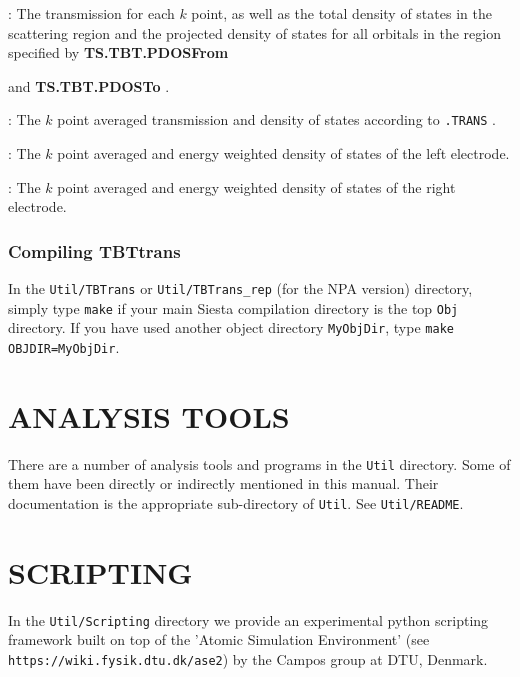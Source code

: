 \documentclass[11pt]{article}
\makeatletter
\newcommand\fdf[1]{%
    \textbf{#1}%
}
\newcommand\file[1]{%
    \texttt{#1}\index{#1@\textbf{#1}}%
}
\newcommand\systemfile[1]{%
    \texttt{<SystemLabel>#1}\index{#1@\textbf{#1}}%
}
\makeatother
\begin{document}
\begin{description}
    \itemsep 10pt
    \parsep 0pt
    
    \item[\systemfile{.TRANS}]: The transmission for each $k$ point,
    as well as the total density of states in the scattering region and the projected
    density of states for all orbitals in the region specified by \fdf{TS.TBT.PDOSFrom}
    and \fdf{TS.TBT.PDOSTo}.

    \item[\systemfile{.AVTRANS}]: The $k$ point averaged
    transmission and density of states according to \file{.TRANS}.

    \item[\systemfile{.LDOS}]: The $k$ point averaged and energy weighted density of states of
    the left electrode.

    \item[\systemfile{.RDOS}]: The $k$ point averaged and energy weighted density of states of
    the right electrode.

\end{description} 

\subsubsection{Compiling TBTtrans}

In the {\tt Util/TBTrans} or \texttt{Util/TBTrans\_rep} (for the NPA version)
 directory, 
simply type {\tt make} if your main {\sc Siesta} compilation 
directory is the top {\tt Obj} directory. If you have used another
 object directory {\tt MyObjDir}, type {\tt make OBJDIR=MyObjDir}.

\section{ANALYSIS TOOLS}

There are a number of analysis tools and programs in the {\tt Util}
directory. Some of them have been directly or indirectly mentioned in
this manual. Their documentation is the appropriate sub-directory of
{\tt Util}. See {\tt Util/README}.

\section{SCRIPTING}

In the {\tt Util/Scripting} directory we provide an experimental
python scripting framework built on top of the 'Atomic Simulation
Environment' (see {\tt https://wiki.fysik.dtu.dk/ase2}) by the Campos
group at DTU, Denmark.
\end{document}
